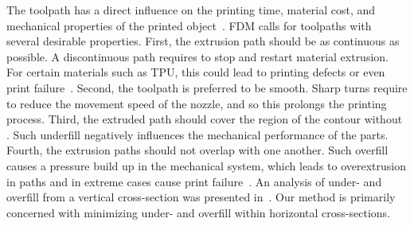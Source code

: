 The toolpath has a direct influence on the printing time, material cost, and mechanical properties of the printed object~\cite{N.Turner2014,ahn2002anisotropic}.
FDM calls for toolpaths with several desirable properties.
First, the extrusion path should be as continuous as possible.
A discontinuous path requires to stop and restart material extrusion.
For certain materials\revise{}{,} such as TPU, this could lead to printing defects or even print failure~\cite{KUIPERS2019CAD}.
Second, the toolpath is preferred to be smooth.
Sharp turns require to reduce the movement speed of the nozzle, and so this prolongs the printing process.
Third, the extruded path should cover the region of the contour without .
Such underfill negatively influences the mechanical performance of the parts.
Fourth, the extrusion paths should not overlap with one another.
Such overfill causes a pressure build up in the mechanical system, which leads to overextrusion in  paths and in extreme cases cause print failure~\cite{KUIPERS2019CAD}.
An analysis of under- and overfill from a vertical cross-section was presented in~\cite{Han2002JMSE}. 
Our method is primarily concerned with minimizing under- and overfill within horizontal cross-sections.


